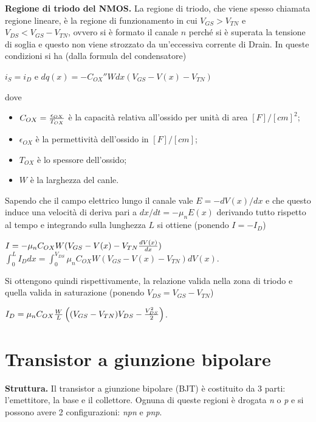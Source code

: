 \documentclass[a4paper,portrait,12pt]{article}
\theoremstyle{definition}
\begin{document}
\textbf{Regione di triodo del NMOS.} La regione di triodo, che viene spesso chiamata regione lineare, è la
regione di funzionamento in cui $V_{GS} > V_{TN}$ e $V_{DS} < V_{GS} - V_{TN}$, ovvero si è formato il canale
$n$ perché si è superata la tensione di soglia e questo non viene strozzato da un'eccessiva corrente di Drain.
In queste condizioni si ha (dalla formula del condensatore)
\begin{center}
$i_S = i_D$ \quad e \quad $dq(x) = -C_{OX}''Wdx (V_{GS} - V(x) - V_{TN})$
\end{center}
dove
\begin{itemize}
\item $C_{OX} = {\epsilon_{OX} \over T_{OX}}$ è la capacità relativa all'ossido per unità di area $[F]/[cm]^2$;
\item $\epsilon_{OX}$ è la permettività dell'ossido in $[F]/[cm]$;
\item $T_{OX}$ è lo spessore dell'ossido;
\item $W$ è la larghezza del canle.
\end{itemize}
Sapendo che il campo elettrico lungo il canale vale $E = - dV(x)/dx$ e che questo induce una velocità
di deriva pari a $dx/dt = - \mu_n E(x)$ derivando tutto rispetto al tempo e integrando sulla lunghezza $L$ 
si ottiene (ponendo $I = -I_D$)
\begin{center}
$I = -\mu_n C_{OX} W (V_{GS} - V(x) - V_{TN} {dV(x) \over dx})$ \quad $\int_0^L I_Ddx = 
\int_0^{V_{DS}} \mu_n C_{OX} W (V_{GS} - V(x) - V_{TN})dV(x)$.
\end{center}
Si ottengono quindi rispettivamente, la relazione valida nella zona di triodo e quella valida in saturazione
(ponendo $V_{DS} = V_{GS} - V_{TN}$)
\begin{center}
$I_D = \mu_n C_{OX} {W \over L} \left((V_{GS} - V_{TN}) V_{DS} - {V_{DS}^2 \over 2}\right)$.
\end{center}
\bigskip


\section{Transistor a giunzione bipolare}

\textbf{Struttura.} Il transistor a giunzione bipolare (BJT) è costituito da 3 parti: l'emettitore, la base
e il collettore. Ognuna di queste regioni è drogata \textit{n} o \textit{p} e si possono avere 2 
configurazioni: \textit{npn} e \textit{pnp}.
\bigskip
\end{document}
